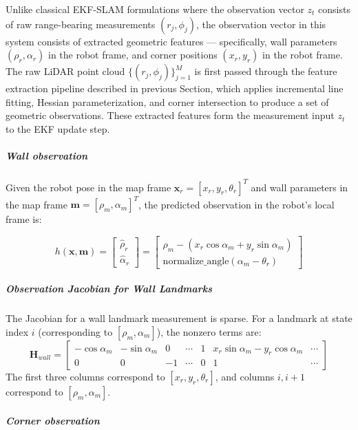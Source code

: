 \documentclass[11pt]{article}
\begin{document}
Unlike classical EKF-SLAM formulations where the observation vector $z_t$ consists 
of raw range-bearing measurements $(r_j, \phi_j)$, the observation vector in this 
system consists of extracted geometric features --- specifically, wall parameters 
$(\rho_r, \alpha_r)$ in the robot frame, and corner positions $(x_r, y_r)$ in the 
robot frame. The raw LiDAR point cloud $\{(r_j, \phi_j)\}_{j=1}^{M}$ is first 
passed through the feature extraction pipeline described in previous Section, 
which applies incremental line fitting, Hessian parameterization, and corner 
intersection to produce a set of geometric observations. These extracted features 
form the measurement input $z_t$ to the EKF update step. 

\subparagraph{Wall observation}

Given the robot pose in the map frame $\mathbf{x}_r = [x_r, y_r, \theta_r]^T$ and wall parameters in the map frame $\mathbf{m} = [\rho_m, \alpha_m]^T$, the predicted observation in the robot's local frame is:

\begin{equation}
	h(\mathbf{x}, \mathbf{m}) =
	\begin{bmatrix}
		\hat{\rho}_r \\
		\hat{\alpha}_r
	\end{bmatrix}
	=
	\begin{bmatrix}
		\rho_m - (x_r \cos\alpha_m + y_r \sin\alpha_m) \\
		\mathrm{normalize\_angle}(\alpha_m - \theta_r)
	\end{bmatrix}
\end{equation}

\subparagraph{Observation Jacobian for Wall Landmarks}

The Jacobian for a wall landmark measurement is sparse. For a landmark at state index $i$ (corresponding to $[\rho_m, \alpha_m]$), the nonzero terms are:
\begin{equation}
	\mathbf{H}_{wall} =
	\begin{bmatrix}
		-\cos\alpha_m & -\sin\alpha_m & 0 & \cdots & 1 & x_r\sin\alpha_m - y_r\cos\alpha_m & \cdots \\
		0 & 0 & -1 & \cdots & 0 & 1 & \cdots
	\end{bmatrix}
\end{equation}
The first three columns correspond to $[x_r, y_r, \theta_r]$, and columns $i, i+1$ correspond to $[\rho_m, \alpha_m]$.

\subparagraph{Corner observation}
\end{document}
